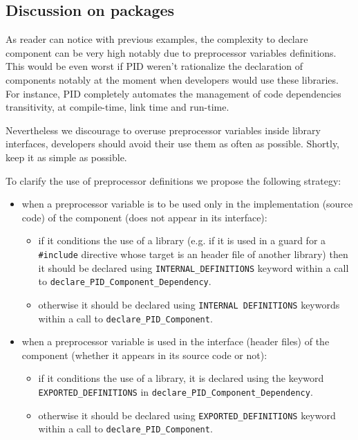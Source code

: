 \documentclass[12pt,a4paper]{article}
\begin{document}
\subsection{Discussion on packages}

As reader can notice with previous examples, the complexity to declare component can be very high notably due to preprocessor variables definitions. This would be even worst if PID weren't rationalize the declaration of components notably at the moment when developers would use these libraries. For instance, PID completely automates the management of code dependencies transitivity, at compile-time,  link time and run-time.

Nevertheless we discourage to overuse preprocessor variables inside library interfaces, developers should avoid their use them as often as possible. Shortly, keep it as simple as possible.

To clarify the use of preprocessor definitions we propose the following strategy:
\begin{itemize}
\item when a preprocessor variable is to be used only in the implementation (source code) of the component (does not appear in its interface):
\begin{itemize}
\item if it conditions the use of a library (e.g. if it is used in a guard for a \texttt{\#include} directive whose target is an header file of another library) then it should be declared using \texttt{INTERNAL\_DEFINITIONS} keyword within a call to \texttt{declare\_PID\_Component\_Dependency}.
\item otherwise it should be declared using \texttt{INTERNAL DEFINITIONS} keywords within a call to \texttt{declare\_PID\_Component}.
\end{itemize}
\item when a preprocessor variable is used in the interface (header files) of the component (whether it appears in its source code or not):
\begin{itemize}
\item if it conditions the use of a library, it is declared using the keyword \texttt{EXPORTED\_DEFINITIONS} in \texttt{declare\_PID\_Component\_Dependency}.
\item otherwise it should be declared using \texttt{EXPORTED\_DEFINITIONS} keyword within a call to \texttt{declare\_PID\_Component}.
\end{itemize}
\end{itemize}
\end{document}
